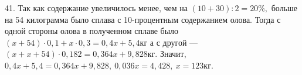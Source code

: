 41. Так как содержание увеличилось менее, чем на $(10+30):2=20\%,$ больше на 54 килограмма было сплава с 10-процентным содержанием олова. Тогда с одной стороны олова в полученном сплаве было $(x+54)\cdot0,1+x\cdot0,3=0,4x+5,4$кг а с другой --- $(x+x+54)\cdot0,182=0,364x+9,828$кг. Значит, $0,4x+5,4=0,364x+9,828,\
0,036x=4,428,\ x=123$кг.\\
